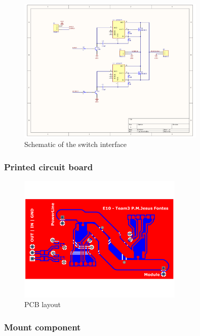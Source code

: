 \begin{figure}[H]
	\begin{centering}
		 \includegraphics[width=0.8\textwidth,page=1]{content/appendix/eudp/images/ps_schematics.pdf}
		\caption{Schematic of the switch interface}
	\end{centering}
\end{figure}

\subsubsection{Printed circuit board}

\begin{figure}[H]
	\begin{centering}
		 \includegraphics[width=0.7\textwidth,page=1]{content/appendix/eudp/images/ps_layout.pdf}
		\caption{PCB layout}
	\end{centering}
\end{figure}

\subsubsection{Mount component}

